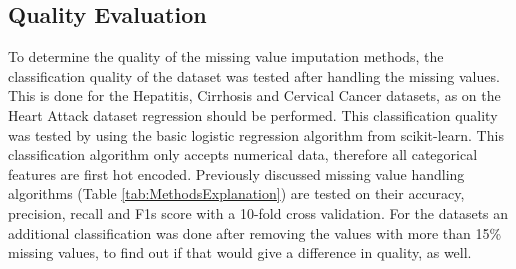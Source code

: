 \documentclass[10pt,a4paper]{report}
\begin{document}
	\subsection{Quality Evaluation}
	\label{MVsubsec:QualityEvaluation}
	
	To determine the quality of the missing value imputation methods, the classification quality of the dataset was tested after handling the missing values. This is done for the Hepatitis, Cirrhosis and Cervical Cancer datasets, as on the Heart Attack dataset regression should be performed. This classification quality was tested by using the basic logistic regression algorithm from scikit-learn. This classification algorithm only accepts numerical data, therefore all categorical features are first hot encoded. Previously discussed missing value handling algorithms (Table \ref{tab:MethodsExplanation}) are tested on their accuracy, precision, recall and F1s score with a 10-fold cross validation. For the datasets an additional classification was done after removing the values with more than 15\% missing values, to find out if that would give a difference in quality, as well. 
	
\end{document}
